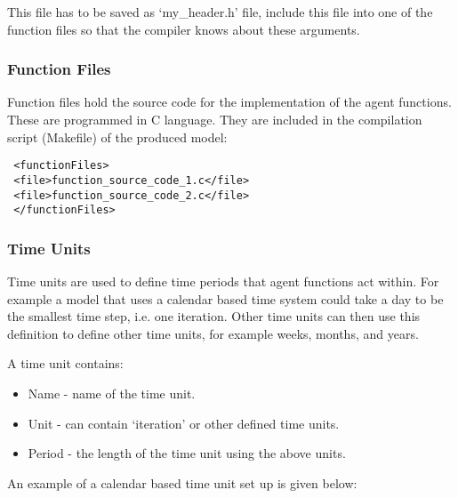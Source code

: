  This file has to be saved as `my\_header.h' file, include this file into one of
 the function files so that the compiler knows about these arguments.

\subsubsection{Function Files}

Function files hold the source code for the implementation of the
agent functions. These are programmed in C language.
They are included in the compilation script (Makefile) of the produced model:

\begin{mylisting}
\begin{verbatim}
 <functionFiles>
 <file>function_source_code_1.c</file>
 <file>function_source_code_2.c</file>
 </functionFiles>
\end{verbatim}
\end{mylisting}

\subsubsection{Time Units}
\label{timeunit}


Time units are used to define time periods that agent functions act within. For
example a model that uses a calendar based time system could take a day to be
the smallest time step, i.e. one iteration. Other time units can then use this
definition to define other time units, for example weeks, months, and years.

A time unit contains:

\begin{itemize}
\item Name - name of the time unit.
\item Unit - can contain `iteration' or other defined time units.
\item Period - the length of the time unit using the above units.
\end{itemize}

An example of a calendar based time unit set up is given below:


